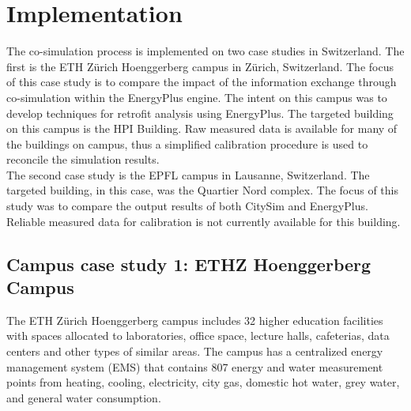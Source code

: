 \documentclass{tBPS2e}
\theoremstyle{plain}
\theoremstyle{definition}
\theoremstyle{remark}
\newcommand{\noteDT}[1]{\footnote{\textcolor{green}{#1}}}
\begin{document}


\section{Implementation}\label{Implementation and results}
The co-simulation process is implemented on two case studies in Switzerland.
The first is the ETH Z\"urich Hoenggerberg campus in Z\"urich, Switzerland.
The focus of this case study is to compare the impact of the information
exchange through co-simulation within the EnergyPlus engine. The intent on
this campus was to develop techniques for retrofit analysis using EnergyPlus.
The targeted building on this campus is the HPI Building. Raw measured data is
available for many of the buildings on campus, thus a simplified calibration
procedure is used to reconcile the simulation results.\\

The second case study is the EPFL campus in Lausanne, Switzerland. The
targeted building, in this case, was the Quartier Nord complex. The focus of
this study was to compare the output results of both CitySim and EnergyPlus.
Reliable measured data for calibration is not currently available for this
building.

\subsection{Campus case study 1: ETHZ Hoenggerberg Campus}
The ETH Z\"urich Hoenggerberg campus includes 32 higher education facilities
 with spaces allocated to laboratories, office space, lecture halls,
 cafeterias, data centers and other types of similar areas. The campus has a
 centralized energy management system (EMS) that contains 807 energy and water
 measurement points from heating, cooling, electricity, city gas, domestic hot
 water, grey water, and general water consumption. %
\end{document}
